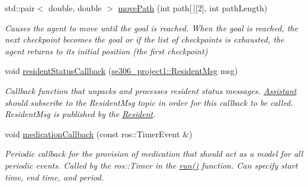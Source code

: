 \begin{DoxyCompactItemize}
\item 
std\-::pair$<$ double, double $>$ \hyperlink{classAssistant_a921c4b094867a4ebc62e404e772d002c}{move\-Path} (int path\mbox{[}$\,$\mbox{]}\mbox{[}2\mbox{]}, int path\-Length)
\begin{DoxyCompactList}\small\item\em Causes the agent to move until the goal is reached. When the goal is reached, the next checkpoint becomes the goal or if the list of checkpoints is exhausted, the agent returns to its initial position (the first checkpoint) \end{DoxyCompactList}\item 
void \hyperlink{classAssistant_ae4f0887ad0748940571fdf9ed1013766}{resident\-Status\-Callback} (\hyperlink{structse306__project1_1_1ResidentMsg__}{se306\-\_\-project1\-::\-Resident\-Msg} msg)
\begin{DoxyCompactList}\small\item\em Callback function that unpacks and processes resident status messages. \hyperlink{classAssistant}{Assistant} should subscribe to the Resident\-Msg topic in order for this callback to be called. Resident\-Msg is published by the \hyperlink{classResident}{Resident}. \end{DoxyCompactList}\item 
void \hyperlink{classAssistant_ae9b3476194ec440164926085a87a81f0}{medication\-Callback} (const ros\-::\-Timer\-Event \&)
\begin{DoxyCompactList}\small\item\em Periodic callback for the provision of medication that should act as a model for all periodic events. Called by the ros\-::\-Timer in the \hyperlink{classAssistant_adaee2d23c3ba9e0c7ed99642424580de}{run()} function. Can specify start time, end time, and period. \end{DoxyCompactList}\end{DoxyCompactItemize}
